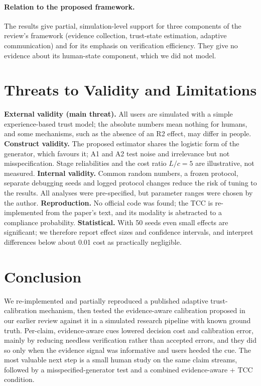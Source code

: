\documentclass[10pt]{article}
\begin{document}
\paragraph{Relation to the proposed framework.} The results give partial, simulation-level support for three components of the review's framework (evidence collection, trust-state estimation, adaptive communication) and for its emphasis on verification efficiency. They give no evidence about its human-state component, which we did not model.

\section{Threats to Validity and Limitations}
\textbf{External validity (main threat).} All users are simulated with a simple experience-based trust model; the absolute numbers mean nothing for humans, and some mechanisms, such as the absence of an R2 effect, may differ in people. \textbf{Construct validity.} The proposed estimator shares the logistic form of the generator, which favours it; A1 and A2 test noise and irrelevance but not misspecification. Stage reliabilities and the cost ratio $L/c=5$ are illustrative, not measured. \textbf{Internal validity.} Common random numbers, a frozen protocol, separate debugging seeds and logged protocol changes reduce the risk of tuning to the results. All analyses were pre-specified, but parameter ranges were chosen by the author. \textbf{Reproduction.} No official code was found; the TCC is re-implemented from the paper's text, and its modality is abstracted to a compliance probability. \textbf{Statistical.} With 50 seeds even small effects are significant; we therefore report effect sizes and confidence intervals, and interpret differences below about 0.01 cost as practically negligible.

\section{Conclusion}
We re-implemented and partially reproduced a published adaptive trust-calibration mechanism, then tested the evidence-aware calibration proposed in our earlier review against it in a simulated research pipeline with known ground truth. Per-claim, evidence-aware cues lowered decision cost and calibration error, mainly by reducing needless verification rather than accepted errors, and they did so only when the evidence signal was informative and users heeded the cue. The most valuable next step is a small human study on the same claim streams, followed by a misspecified-generator test and a combined evidence-aware + TCC condition.
\end{document}
